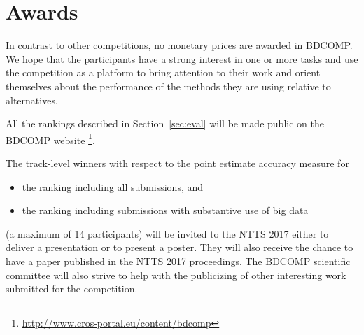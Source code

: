 \documentclass[12pt]{article}
\begin{document}
\newpage
\section{Awards}
\label{sec:awards}

In contrast to other competitions, no monetary prices are awarded in BDCOMP. We hope that the participants have a strong interest in one or more tasks and use the competition as a platform to bring attention to their work and orient themselves about the performance of the methods they are using relative to alternatives. 

All the rankings described in Section~\ref{sec:eval} will be made public on the BDCOMP website \footnote{\url{http://www.cros-portal.eu/content/bdcomp}}. 

The track-level winners with respect to the point estimate accuracy measure for 
\begin{itemize}
\item{the ranking including all submissions, and}
\item{the ranking including submissions with substantive use of big data}
\end{itemize}
(a maximum of 14 participants) will be invited to the NTTS 2017 either to deliver a presentation or to present a poster. They will also receive the chance to have a paper published in the NTTS 2017 proceedings. The BDCOMP scientific committee will also strive to help with the publicizing of other interesting work submitted for the competition.
\end{document}
